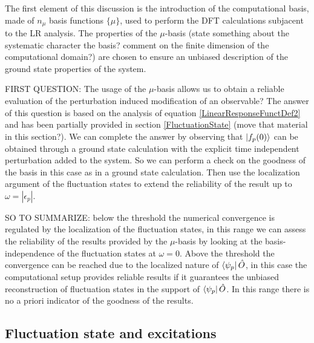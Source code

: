 \documentclass[reprint,aps,prb]{revtex4-1}
\newcommand{\eps}{\epsilon}
\newcommand{\op}[1]{\hat {#1}}
\begin{document}
The first element of this discussion is the introduction of the computational basis, made of $n_\mu$ basis functions $\{\mu\}$, used to perform the DFT calculations subjacent to the LR analysis. 
The properties of the $\mu$-basis (state something about the systematic character the basis? comment on the finite dimension of the computational domain?) are chosen to ensure an unbiased description 
of the ground state properties of the system. 

FIRST QUESTION: The usage of the $\mu$-basis allows us to obtain a reliable evaluation of the perturbation induced modification of an observable? 
The answer of this question is based on the analysis of equation \eqref{LinearResponseFunctDef2} and has been partially provided in section \ref{FluctuationState} (move that material in this section?). 
We can complete the answer by observing that $\ket{f_p(0)}$ can be obtained through a ground state calculation with the explicit time independent perturbation added to the system. So we can perform
a check on the goodness of the basis in this case as in a ground state calculation. Then use the localization argument of the fluctuation states to extend the reliability of the result up to
$\omega=|\eps_p|$. 

SO TO SUMMARIZE: below the threshold the numerical convergence is regulated by the localization of the fluctuation states, in this range we can assess the reliability of the results provided by
the $\mu$-basis by looking at the basis-independence of the fluctuation states at $\omega=0$. Above the threshold the convergence can be reached due to the localized nature of $\bra{\psi_p}\op O$, 
in this case the computational setup provides reliable results if it guarantees the unbiased reconstruction of fluctuation states in the support of $\bra{\psi_p}\op O$. In this range there is no a 
priori indicator of the goodness of the results. 


\subsection{Fluctuation state and excitations}
\end{document}

